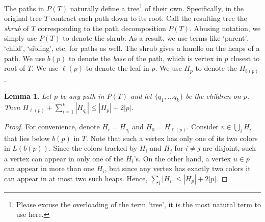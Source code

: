 \documentclass[11pt]{article}
\newcommand{\ignore}[1]{}
\newtheorem{lemma}[theorem]{Lemma}
\theoremstyle{definition}
\begin{document}
The paths in $P(T)$ naturally define a tree\footnote{Please excuse the 
overloading of the term 'tree', it is the most natural term to use here.} of their own.  Specifically, in the original 
tree $T$ contract each path down to its root.  Call the resulting tree the \emph{shrub} of $T$ corresponding to 
the path decomposition $P(T)$. Abusing notation, we simply use $P(T)$ to denote the shrub.
As a result, we use terms like `parent', `child', `sibling', etc. for paths as well.
The shrub gives a handle on the heaps of a path.
We use $b(p)$ to denote the \emph{base} of the path, which is vertex in $p$ closest
to root of $T$. We use $\ell(p)$ to denote the leaf in $p$.
We use $H_p$ to denote the $H_{b(p)}$.

\begin{lemma}
\label{lem:adjacent}
 Let $p$ be any path in $P(T)$ and let $\{q_1, \dots q_k\}$ be the children on $p$.
Then $H_{\ell(p)} + \sum_{i=1}^k |H_{q_i}| \leq |H_p|+2|p|$. 
\end{lemma}

\begin{proof} For convenience, denote $H_i = H_{q_i}$ and $H_0 = H_{\ell(p)}$.
Consider $v \in \bigcup_{i} H_i$ that lies below $b(p)$ in $T$. 
Note that such a vertex has only one of its two colors in $L(b(p))$.  
Since the colors tracked by $H_i$ and $H_j$ for $i\neq j$ are disjoint, 
such a vertex can appear in only one of the $H_i$'s.
On the other hand, a vertex $u\in p$ can appear in more than one $H_i$, 
but since any vertex has exactly two colors it can appear in at most two 
such heaps.  Hence, $\sum_i |H_i| \leq |H_p| + 2|p|$.
\ignore{
 First observe that for all $i$, $r_{i}$ lies above $r_p$ on some root to leaf path. 
 Let $H_i'$ be the subset of $H_i$ that lies below $r_p$.  Observe that $H_i'\subseteq H_p$, as $L(T_{r_i})\subseteq L(T_{r_p})$.
  
 Now for any $i\neq j$, $H_i \cap H_j = \emptyset$, as $r_{i}$ and $r_{j}$ are not on the same root to leaf path (i.e. $L(T_{r_i}) \cap L(T_{r_j}) = \emptyset$).
 In particular, $(H_i\setminus H_i') \cap (H_j \setminus H_j') = \emptyset$, and so $\sum_{i=0}^k |H_i\setminus H_i'| \leq |p|$ 
 as $H_i\setminus H_i'$ is precisely the subset of $H_i$ that lies on $p$.
 Moreover, for any $i\neq j$, $ H_i' \cap H_j' = \emptyset$, and so since $H_i'\subseteq H_p$ we have $\sum_{i=0}^k |H_i'|\leq |H_p|$.
 Putting these together gives
 \[
  \sum_{i=0}^k |H_i| = \sum_{i=0}^k |H_i'| + \sum_{i=0}^k |H_i\setminus H_i'| \leq |H_p|+|p|.
 \]
}
\end{proof}
\end{document}

